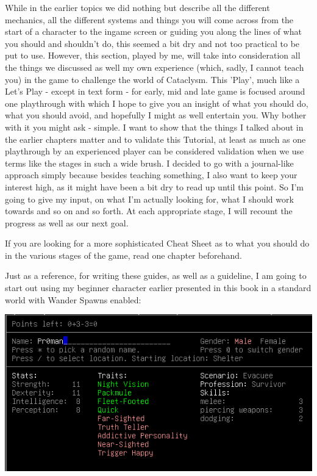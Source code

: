\documentclass[11pt]{report}
\begin{document}
While in the earlier topics we did nothing but describe all the different mechanics, all the different systems and things you will come across from the start of a character to the ingame screen or guiding you along the lines of what you should and shouldn't do, this seemed a bit dry and not too practical to be put to use. However, this section, played by me, will take into consideration all the things we discussed as well my own experience (which, sadly, I cannot teach you) in the game to challenge the world of Cataclysm. This 'Play', much like a Let's Play - except in text form - for early, mid and late game is focused around one playthrough with which I hope to give you an insight of what you should do, what you should avoid, and hopefully I might as well entertain you. Why bother with it you might ask - simple. I want to show that the things I talked about in the earlier chapters matter and to validate this Tutorial, at least as much as one playthrough by an experienced player can be considered validation when we use terms like the stages in such a wide brush. I decided to go with a journal-like approach simply because besides teaching something, I also want to keep your interest high, as it might have been a bit dry to read up until this point. So I'm going to give my input, on what I'm actually looking for, what I should work towards and so on and so forth. At each appropriate stage, I will recount the progress as well as our next goal.

If you are looking for a more sophisticated Cheat Sheet as to what you should do in the various stages of the game, read one chapter beforehand.

Just as a reference, for writing these guides, as well as a guideline, I am going to start out using my beginner character earlier presented in this book in a standard world with Wander Spawns enabled:

\includegraphics[width=\textwidth]{06}
\end{document}

